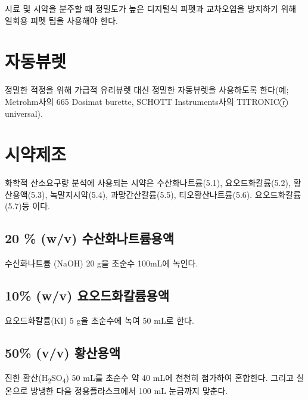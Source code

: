 \documentclass[
]{book}
\begin{document}
시료 및 시약을 분주할 때 정밀도가 높은 디지털식 피펫과 교차오염을 방지하기 위해 일회용 피펫 팁을 사용해야 한다.

\hypertarget{uxc790uxb3d9uxbdf0uxb81b}{%
\section{자동뷰렛}\label{uxc790uxb3d9uxbdf0uxb81b}}

정밀한 적정을 위해 가급적 유리뷰렛 대신 정밀한 자동뷰렛을 사용하도록 한다(예; Metrohm사의 665 Dosimat burette, SCHOTT Instruments사의 TITRONICⓡ universal).

\hypertarget{uxc2dcuxc57duxc81cuxc870-1}{%
\section{시약제조}\label{uxc2dcuxc57duxc81cuxc870-1}}

화학적 산소요구량 분석에 사용되는 시약은 수산화나트륨(5.1), 요오드화칼륨(5.2), 황산용액(5.3), 녹말지시약(5.4), 과망간산칼륨(5.5), 티오황산나트륨(5.6). 요오드화칼륨(5.7)등 이다.

\hypertarget{wv-uxc218uxc0b0uxd654uxb098uxd2b8uxb968uxc6a9uxc561}{%
\subsection{20 \% (w/v) 수산화나트륨용액}\label{wv-uxc218uxc0b0uxd654uxb098uxd2b8uxb968uxc6a9uxc561}}

수산화나트륨 (NaOH) 20 g을 초순수 100mL에 녹인다.

\hypertarget{wv-uxc694uxc624uxb4dcuxd654uxce7cuxb968uxc6a9uxc561}{%
\subsection{10\% (w/v) 요오드화칼륨용액}\label{wv-uxc694uxc624uxb4dcuxd654uxce7cuxb968uxc6a9uxc561}}

요오드화칼륨(KI) 5 g을 초순수에 녹여 50 mL로 한다.

\hypertarget{vv-uxd669uxc0b0uxc6a9uxc561}{%
\subsection{50\% (v/v) 황산용액}\label{vv-uxd669uxc0b0uxc6a9uxc561}}

진한 황산(H\textsubscript{2}SO\textsubscript{4}) 50 mL를 초순수 약 40 mL에 천천히 첨가하여 혼합한다. 그리고 실온으로 방냉한 다음 정용플라스크에서 100 mL 눈금까지 맞춘다.
\end{document}
